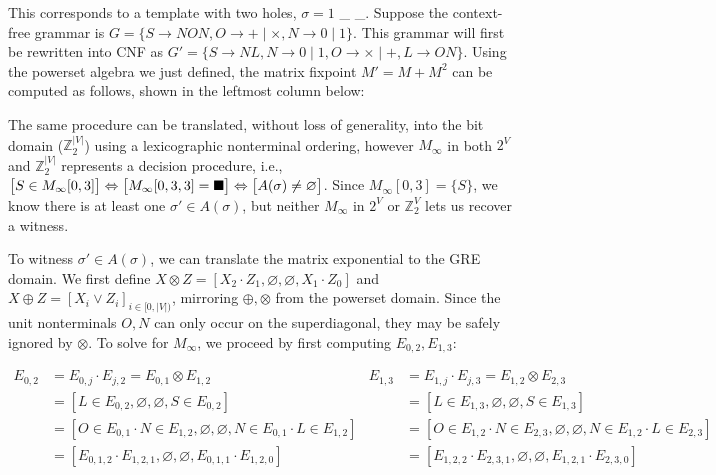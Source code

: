 \documentclass[sigplan,review,acmsmall,nonacm,screen,anonymous]{acmart}\settopmatter{printfolios=false,printccs=false,printacmref=false}
\begin{document}
\noindent This corresponds to a template with two holes, $\sigma = 1$ \_ \_. Suppose the context-free grammar is $G=\{S\rightarrow N O N, O \rightarrow + \mid \times, N \rightarrow 0 \mid 1\}$. This grammar will first be rewritten into CNF as $G'= \{S \rightarrow N L, N \rightarrow 0 \mid 1, O \rightarrow \times \mid +, L \rightarrow O N\}$. Using the powerset algebra we just defined, the matrix fixpoint $M' = M + M^2$ can be computed as follows, shown in the leftmost column below:\vspace{0.3cm}



\vspace{8pt}The same procedure can be translated, without loss of generality, into the bit domain ($\mathbb{Z}_2^{|V|}$) using a lexicographic nonterminal ordering, however $M_\infty$ in both $2^V$ and $\mathbb{Z}_2^{|V|}$ represents a decision procedure, i.e., $\big[S\in M_\infty[0, 3]\big]\Leftrightarrow \big[M_\infty[0, 3, 3]=\blacksquare\big] \Leftrightarrow \big[A(\sigma) \neq \varnothing\big]$. Since $M_\infty[0, 3] = \{S\}$, we know there is at least one $\sigma' \in A(\sigma)$, but neither $M_\infty$ in $2^V$ or $\mathbb{Z}_2^V$ lets us recover a witness.


To witness $\sigma' \in A(\sigma)$, we can translate the matrix exponential to the GRE domain. We first define $X \otimes Z = [X_2 \cdot Z_1, \varnothing, \varnothing, X_1 \cdot Z_0]$ and $X \oplus Z = [X_i \lor Z_i]_{i \in [0, |V|)}$, mirroring $\oplus, \otimes$ from the powerset domain. Since the unit nonterminals $O, N$ can only occur on the superdiagonal, they may be safely ignored by $\otimes$. To solve for $M_\infty$, we proceed by first computing $E_{0, 2}, E_{1, 3}$:\vspace{-8pt}

\begin{small}
\begin{align*}
  E_{0, 2} &= E_{0, j} \cdot E_{j, 2} = E_{0, 1} \otimes E_{1, 2}                         &  E_{1, 3} &= E_{1, j} \cdot E_{j, 3} = E_{1, 2} \otimes E_{2, 3}\\
  &= [L \in E_{0, 2}, \varnothing, \varnothing, S \in E_{0, 2}]                                           &  &= [L \in E_{1, 3}, \varnothing, \varnothing, S \in E_{1, 3}]\\
  &= [O \in E_{0, 1} \cdot N \in E_{1, 2}, \varnothing, \varnothing, N \in E_{0, 1} \cdot L \in E_{1, 2}] &  &= [O \in E_{1, 2} \cdot N \in E_{2, 3}, \varnothing, \varnothing, N \in E_{1, 2} \cdot L \in E_{2, 3}]\\
  &= [E_{0, 1, 2} \cdot E_{1, 2, 1}, \varnothing, \varnothing, E_{0, 1, 1} \cdot E_{1, 2, 0}]             &  &= [E_{1, 2, 2} \cdot E_{2, 3, 1}, \varnothing, \varnothing, E_{1, 2, 1} \cdot E_{2, 3, 0}]
\end{align*}
\end{small}\vspace{-8pt}
\end{document}
